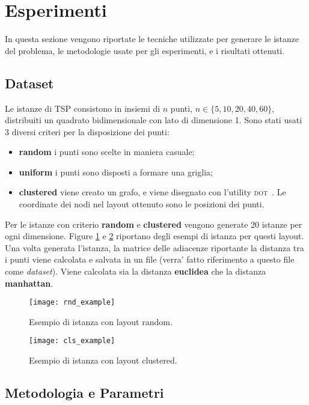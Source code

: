 \documentclass[
12pt, %
a4paper, %
oneside, %
headinclude,footinclude, %
BCOR5mm, %
]{scrartcl}
\begin{document}
\section{Esperimenti}\label{sec:exp}
In questa sezione vengono riportate le tecniche utilizzate per generare le istanze del problema, le metodologie usate per gli esperimenti, e i risultati ottenuti.

\subsection{Dataset}
Le istanze di TSP consistono in insiemi di $n$ punti, $n \in \{5, 10, 20, 40, 60\}$, distribuiti un quadrato bidimensionale con lato di dimensione 1. Sono stati usati 3 diversi criteri per la disposizione dei punti:
\begin{itemize}
	\item \textbf{random} i punti sono scelte in maniera casuale;
	\item \textbf{uniform} i punti sono disposti a formare una griglia;
	\item \textbf{clustered} viene creato un grafo, e viene disegnato con l'utility \textsc{dot}~\cite{gansner2006drawing}. Le coordinate dei nodi nel layout ottenuto sono le posizioni dei punti.
\end{itemize}
Per le istanze con criterio \textbf{random} e \textbf{clustered} vengono generate 20 istanze per ogni dimensione. Figure \ref{fig:rnd} e \ref{fig:cls} riportano degli esempi di istanza per questi layout. Una volta generata l'istanza, la matrice delle adiacenze riportante la distanza tra i punti viene calcolata e salvata in un file (verra' fatto riferimento a questo file come \textit{dataset}). Viene calcolata sia la distanza \textbf{euclidea} che la distanza \textbf{manhattan}.

\begin{figure}[H]
	\centering
	\texttt{[image: rnd\_example]}
	\caption[random]{Esempio di istanza con layout random.}
	\label{fig:rnd}
\end{figure}

\begin{figure}[H]
	\centering
	\texttt{[image: cls\_example]}
	\caption[clustered]{Esempio di istanza con layout clustered.}
	\label{fig:cls}
\end{figure}

\subsection{Metodologia e Parametri}
\end{document}
